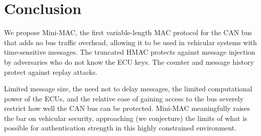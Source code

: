 \section{Conclusion}

We propose Mini-MAC, the first variable-length MAC protocol for the CAN bus that adds no bus traffic overhead, 
allowing it to be used in vehicular systems with time-sensitive messages.  The truncated HMAC protects against
message injection by adversaries who do not know the ECU keys.  The counter and message history protect
against replay attacks.  

Limited message size, the need not to delay messages, the limited computational power of the ECUs,
and the relative ease of gaining access to the bus 
severely restrict how well the CAN bus can be protected.  Mini-MAC meaningfully raises the bar on vehicular security,
approaching (we conjecture) the limits of what is possible for authentication strength in this highly
constrained environment.

